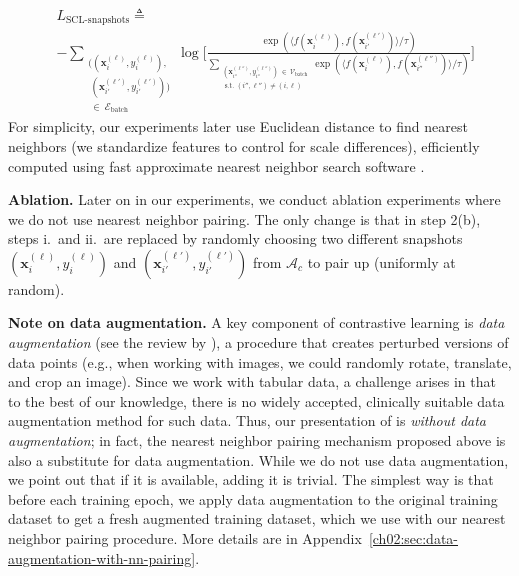 \begin{align*}
    &L_{\text{SCL-snapshots}} \triangleq \\
    &- \!\!\!\!\!\!\!\!%
    \sum_{\substack{((\mathbf{x}_i^{(\ell)}, y_i^{(\ell)}), \\ ~\!(\mathbf{x}_{i'}^{(\ell')}, y_{i'}^{(\ell')})) \\ ~\!\in~\!  \mathcal{E}_{\text{batch}}}} \!\!\!\!\!\!%
    \log\Bigg[
\frac{\exp(\langle f(\mathbf{x}_i^{(\ell)}), f(\mathbf{x}_{i'}^{(\ell')}) \rangle / \tau)}{\sum\limits_{\substack{(\mathbf{x}_{i''}^{(\ell'')}, y_{i''}^{(\ell'')}) ~\!\in~\!  \mathcal{V}_{\text{batch}} \\ \text{~s.t.~}(i'',\ell'')\ne(i,\ell)}} \!\!\!\!\!\!\!\!\!\!\!\!\!\!\!\exp(\langle f(\mathbf{x}_i^{(\ell)}), f(\mathbf{x}_{i''}^{(\ell'')}) \rangle / \tau)}\Bigg]
\end{align*}
For simplicity, our experiments later use Euclidean distance to find nearest neighbors (we standardize features to control for scale differences), efficiently computed using fast approximate nearest neighbor search software \citep{malkov2018efficient}.





\noindent
\textbf{Ablation.}
Later on in our experiments, we conduct ablation experiments where we do not use nearest neighbor pairing.
The only change is that in step 2(b), steps i.~and ii.~are replaced by randomly choosing two different snapshots $(\mathbf{x}_{i}^{(\ell)}, y_{i}^{(\ell)})$ and $(\mathbf{x}_{i'}^{(\ell')}, y_{i'}^{(\ell')})$ from $\mathcal{A}_c$ to pair up (uniformly at random).



\noindent
\textbf{Note on data augmentation.}
A key component of contrastive learning is \emph{data augmentation} (see the review by \citet{le2020contrastive}), a procedure that creates perturbed versions of data points (e.g., when working with images, we could randomly rotate, translate, and crop an image).
Since we work with tabular data, a challenge arises in that to the best of our knowledge, there is no widely accepted, clinically suitable data augmentation method for such data.
Thus, our presentation of  is \emph{without data augmentation}; in fact, the nearest neighbor pairing mechanism proposed above is also a substitute for data augmentation. %
While we do not use data augmentation, we point out that if it is available, adding it is trivial.
The simplest way is that before each training epoch, we apply data augmentation to the original training dataset to get a fresh augmented training dataset, which we use with our nearest neighbor pairing procedure.
More details are in Appendix~\ref{ch02:sec:data-augmentation-with-nn-pairing}.



